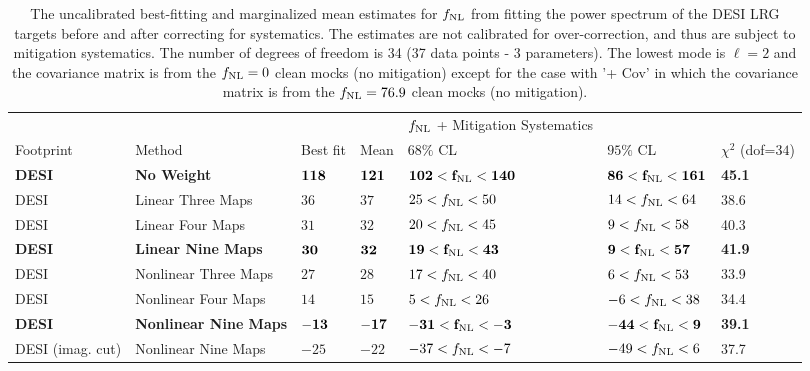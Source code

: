 \begin{table}
    \caption{The uncalibrated best-fitting and marginalized mean estimates for $f_{\rm NL}$ from fitting the power spectrum of the DESI LRG targets before and after correcting for systematics. The estimates are not calibrated for over-correction, and thus are subject to mitigation systematics. The number of degrees of freedom is 34 (37 data points - 3 parameters). The lowest mode is $\ell=2$ and the covariance matrix is from the $f_{\rm NL}=0$ clean mocks (no mitigation) except for the case with '+ Cov' in which the covariance matrix is from the $f_{\rm NL}=76.9$ clean mocks (no mitigation). }
    \label{tab:dr9method}
    \begin{tabular}{lllllll}
    \hline
    \hline
   &  & &  &  $f_{\rm NL}$ + Mitigation Systematics   & &  \\
   \cmidrule(r{.7cm}){3-6}
Footprint                               & Method & 	Best fit  & Mean & $ 68\%$ CL & $ 95\%$ CL & $\chi^{2}$ (dof=$34$) \\
    \hline
\bf{DESI} & \bf{No Weight}                        & $   \bf{118}$& $   \bf{121}$& $   \bf{102}<f_{\rm NL}<   \bf{140}$& $    \bf{86}< f_{\rm NL}<   \bf{161}$ &   \bf{45.1}\\
DESI & Linear Three Maps                & $    36$& $    37$& $    25<f_{\rm NL}<    50$& $    14<f_{\rm NL}<    64$ &   38.6\\
DESI & Linear Four Maps                 & $    31$& $    32$& $    20<f_{\rm NL}<    45$& $     9<f_{\rm NL}<    58$ &   40.3\\
\bf{DESI} & \bf{Linear Nine Maps}                 & $    \bf{30}$& $    \bf{32}$& $    \bf{19}<f_{\rm NL}<   \bf{43}$& $     \bf{9}<f_{\rm NL}<  \bf{57}$ &   \bf{41.9}\\
DESI & Nonlinear Three Maps             & $    27$& $    28$& $    17<f_{\rm NL}<    40$& $     6<f_{\rm NL}<    53$ &   33.9\\
DESI & Nonlinear Four Maps              & $    14$& $    15$& $     5<f_{\rm NL}<    26$& $    -6<f_{\rm NL}<    38$ &   34.4\\
\bf{DESI} & \bf{Nonlinear Nine Maps}              & $   \bf{-13}$& $   \bf{-17}$& $   \bf{-31}<f_{\rm NL}<    \bf{-3}$& $   \bf{-44}<f_{\rm NL}<     \bf{9}$ &  \bf{39.1}\\
DESI (imag. cut) & Nonlinear Nine Maps  & $   -25$& $   -22$& $   -37<f_{\rm NL}<    -7$& $   -49<f_{\rm NL}<     6$ &   37.7\\

\end{tabular}
\end{table}
